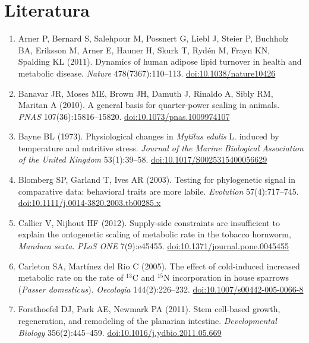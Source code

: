 \section*{Literatura}
\begin{small}\raggedright
\begin{enumerate}[label={},leftmargin=1.2em,itemindent=-1.2em,itemsep=0.15em]
\item Arner P, Bernard S, Salehpour M, Possnert G, Liebl J, Steier P, Buchholz BA, Eriksson M, Arner E, Hauner H, Skurk T, Rydén M, Frayn KN, Spalding KL (2011). Dynamics of human adipose lipid turnover in health and metabolic disease. \emph{Nature} 478(7367):110–113. \href{https://doi.org/10.1038/nature10426}{doi:10.1038/nature10426}
\item Banavar JR, Moses ME, Brown JH, Damuth J, Rinaldo A, Sibly RM, Maritan A (2010). A general basis for quarter-power scaling in animals. \emph{PNAS} 107(36):15816–15820. \href{https://doi.org/10.1073/pnas.1009974107}{doi:10.1073/pnas.1009974107}
\item Bayne BL (1973). Physiological changes in \emph{Mytilus edulis} L. induced by temperature and nutritive stress. \emph{Journal of the Marine Biological Association of the United Kingdom} 53(1):39–58. \href{https://doi.org/10.1017/S0025315400056629}{doi:10.1017/S0025315400056629}
\item Blomberg SP, Garland T, Ives AR (2003). Testing for phylogenetic signal in comparative data: behavioral traits are more labile. \emph{Evolution} 57(4):717–745. \href{https://doi.org/10.1111/j.0014-3820.2003.tb00285.x}{doi:10.1111/j.0014-3820.2003.tb00285.x}
\item Callier V, Nijhout HF (2012). Supply-side constraints are insufficient to explain the ontogenetic scaling of metabolic rate in the tobacco hornworm, \emph{Manduca sexta}. \emph{PLoS ONE} 7(9):e45455. \href{https://doi.org/10.1371/journal.pone.0045455}{doi:10.1371/journal.pone.0045455}
\item Carleton SA, Martínez del Rio C (2005). The effect of cold-induced increased metabolic rate on the rate of $^{13}$C and $^{15}$N incorporation in house sparrows (\emph{Passer domesticus}). \emph{Oecologia} 144(2):226–232. \href{https://doi.org/10.1007/s00442-005-0066-8}{doi:10.1007/s00442-005-0066-8}
\item Forsthoefel DJ, Park AE, Newmark PA (2011). Stem cell-based growth, regeneration, and remodeling of the planarian intestine. \emph{Developmental Biology} 356(2):445–459. \href{https://doi.org/10.1016/j.ydbio.2011.05.669}{doi:10.1016/j.ydbio.2011.05.669}

\end{enumerate}
\end{small}

